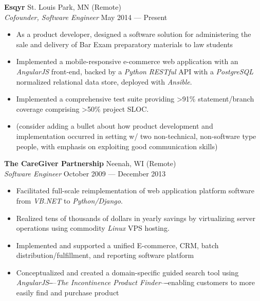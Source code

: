 \documentclass[line,margin]{res}
\begin{document}
\begin{resume}
    \textbf{Esqyr} \hfill St. Louis Park, MN {\small (Remote)} \\
    \textit{Cofounder, Software Engineer} \hfill May 2014 --- Present
        \begin{itemize}  \itemsep -2pt
            \item As a product developer, designed a software solution for
                administering the sale and delivery of Bar Exam preparatory
                materials to law students
            \item Implemented a mobile-responsive e-commerce web application
                with an \textit{AngularJS} front-end, backed by a
                \textit{Python} \textit{RESTful} API with a \textit{PostgreSQL}
                normalized relational data store, deployed with
                \textit{Ansible}.
            \item Implemented a comprehensive test suite providing
                \textgreater91\% statement/branch coverage comprising
                \textgreater50\% project SLOC.
            \item (consider adding a bullet about how product development and
                implementation occurred in setting w/ two non-technical,
                non-software type people, with emphasis on exploiting good
                communication skills)
        \end{itemize}

    \textbf{The CareGiver Partnership} \hfill Neenah, WI {\small (Remote)} \\
    \textit{Software Engineer} \hfill October 2009 --- December 2013
        \begin{itemize}  \itemsep -2pt
            \item Facilitated full-scale reimplementation of web application
                platform software from \textit{VB.NET} to
                \textit{Python/Django}.
            \item Realized tens of thousands of dollars in yearly savings by
                virtualizing server operations using commodity \textit{Linux}
                VPS hosting.
            \item Implemented and supported a unified E-commerce, CRM, batch
                distribution/fulfillment, and reporting software platform
            \item Conceptualized and created a domain-specific guided search
                tool using \textit{AngularJS}‒--\textit{The Incontinence
                Product Finder}--‒enabling customers to more easily find and
                purchase product
        \end{itemize}


\end{resume}
\end{document}

